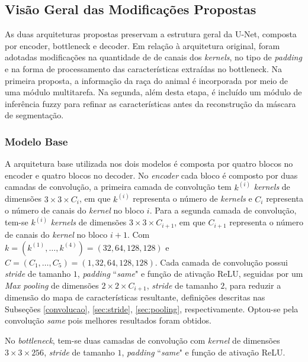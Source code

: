 \subsection{Visão Geral das Modificações Propostas}

As duas arquiteturas propostas preservam a estrutura geral da U-Net, composta por encoder, bottleneck e decoder. Em relação à arquitetura original, foram adotadas modificações na quantidade de de canais dos \textit{kernels}, no tipo de \textit{padding} e na forma de processamento das características extraídas no bottleneck. Na primeira proposta, a informação da raça do animal é incorporada por meio de uma módulo multitarefa. Na segunda, além desta etapa, é incluído um módulo de inferência fuzzy para refinar as características antes da reconstrução da máscara de segmentação.

\subsubsection{Modelo Base}
A arquitetura base utilizada nos dois modelos é composta por quatro blocos no encoder e quatro blocos no decoder.
No \textit{encoder} cada bloco é composto por duas camadas de convolução, a primeira camada de convolução tem $k^{(i)}$ \textit{kernels} de dimensões $3\times 3 \times C_i$, em que $k^{(i)}$ representa o número de \textit{kernels} e $C_i$ representa o número de canais do \textit{kernel} no bloco $i$. Para a segunda camada de convolução, tem-se $k^{(i)}$ \textit{kernels} de dimensões $3\times 3 \times C_{i+1}$, em que $C_{i+1}$ representa o número de canais do \textit{kernel} no bloco $i+1$. Com $k = (k^{(1)}, \hdots, k^{(4)}) = (32,64,128,128)$ e $C = (C_1, \hdots, C_5) = (1, 32, 64, 128, 128)$. Cada camada de convolução possui \textit{stride} de tamanho $1$, \textit{padding} ``\textit{same}" e  função de ativação ReLU, seguidas por um \textit{Max pooling} de dimensões $2\times 2 \times C_{i+1}$, \textit{stride} de tamanho $2$, para reduzir a dimensão do mapa de características resultante, definições descritas nas Subseções \ref{convolucao}, \ref{sec:stride}, \ref{sec:pooling}, respectivamente. Optou-se pela convolução \textit{same} pois melhores resultados foram obtidos.
    
No \textit{bottleneck}, tem-se duas camadas de convolução com \textit{kernel} de dimensões $3\times 3 \times 256$, \textit{stride} de tamanho $1$, \textit{padding} ``\textit{same}" e função de ativação ReLU.

